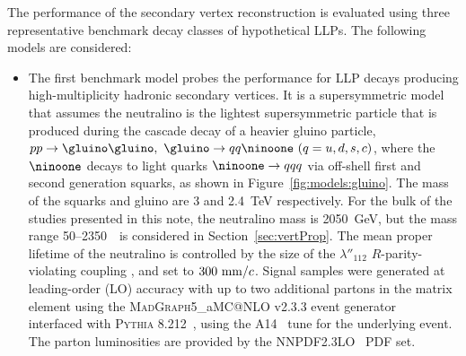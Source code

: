 \documentclass[PUB,UKenglish, texlive=2018]{\ATLASLATEXPATH atlasdoc}
\begin{document}

The performance of the secondary vertex reconstruction is evaluated using three representative benchmark decay classes of hypothetical LLPs. 
The following models are considered: 

%
%
\begin{itemize}

\item The first benchmark model probes the performance for LLP decays producing high-multiplicity hadronic secondary vertices. It is a supersymmetric model that assumes the neutralino is the lightest supersymmetric particle that is produced during the cascade decay of a heavier gluino particle, $pp\rightarrow\gluino\gluino,~\gluino\rightarrow qq\ninoone~(q=u,d,s,c)$, where the $\ninoone$ decays to light quarks $\ninoone\rightarrow qqq$ via off-shell first and second generation squarks, as shown in Figure~\ref{fig:models:gluino}.
The mass of the squarks and gluino are 3 and 2.4~TeV respectively.  For the bulk of the studies presented in this note, the neutralino mass is 2050~GeV, but the mass range 50--2350~\GeV\ is considered in Section~\ref{sec:vertProp}.  The mean proper lifetime of the neutralino is controlled by the size of the $\lambda''_{112}$ $R$-parity-violating coupling \cite{FARRAR1978575,HALL1984419,ROSS1985375,PhysRevD.40.2987,doi:10.1142/9789814307505_0017,PhysRevD.69.115002}, and set to $300~{\rm mm}/c$.
Signal samples were generated at leading-order (LO) accuracy with up to two additional partons in the matrix element using the \textsc{MadGraph}5\_aMC@NLO v2.3.3 event generator~\cite{Alwall2014} 
interfaced with \textsc{Pythia} 8.212~\cite{Sjostrand:2014zea}, using the A14~\cite{ATL-PHYS-PUB-2014-021} tune for the underlying event. 
The parton luminosities are provided by the NNPDF2.3LO~\cite{Ball:2014uwa} PDF set.



\end{itemize}
\end{document}
